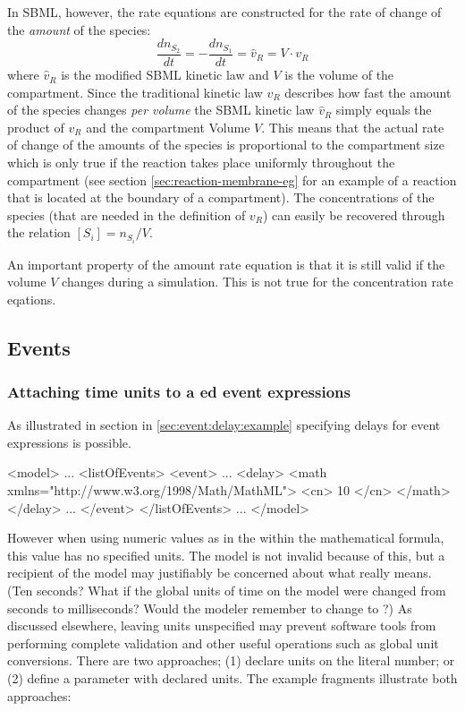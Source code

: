 In SBML, however, the rate equations are constructed for the rate
of change of the \emph{amount }of the species:\[
\frac{dn_{S_{2}}}{dt}=-\frac{dn_{S_{1}}}{dt}=\hat{v}_{R}=V\cdot v_{R}\]
where $\hat{v}_{R}$ is the modified SBML kinetic law and $V$ is
the volume of the compartment. Since the traditional kinetic law $v_{R}$
describes how fast the amount of the species changes \emph{per volume}
the SBML kinetic law $\hat{v}_{R}$ simply equals the product of $v_{R}$
and the compartment Volume $V$. This means that the actual rate of
change of the amounts of the species is proportional to the compartment
size which is only true if the reaction takes place uniformly throughout
the compartment (see section \vref{sec:reaction-membrane-eg} for
an example of a reaction that is located at the boundary of a compartment).
The concentrations of the species (that are needed in the definition
of $v_{R}$) can easily be recovered through the relation $[S_{i}]=n_{S_{i}}/V$. 

An important property of the amount rate equation is that it is still
valid if the volume $V$ changes during a simulation. This is not
true for the concentration rate eqations. 


\subsection{Events}
\label{sec:bp:events}

\subsubsection{Attaching time units to a ed event expressions}
\label{sec:bp:event:delay}

As illustrated in section in \ref{sec:event:delay:example}  specifying delays for 
event expressions is possible. 

\begin{example}
<model>
    ...
    <listOfEvents>
        <event>
            ...
            <delay>
                <math xmlns="http://www.w3.org/1998/Math/MathML">
                    <cn> 10 </cn>
                </math>
            </delay>
            ...
        </event>
    </listOfEvents>
    ...
</model>
\end{example}

However when using numeric values as in  the  within 
the mathematical formula, this value has no specified units.  The model is 
not invalid because of this, but
a recipient of the model may justifiably be concerned about what
 really means.  (Ten seconds?  What if the global units of
time on the model were changed from seconds to milliseconds?
Would the modeler remember to change  to ?)
As discussed elsewhere, leaving units unspecified may prevent
software tools from performing complete validation and other
useful operations such as global unit conversions.  There are
two approaches; (1) declare units on the literal number; or (2) 
define a parameter with declared units.  The example fragments
illustrate both approaches:

